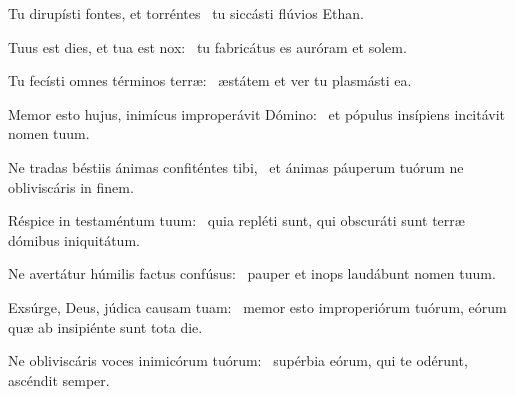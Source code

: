 \item Tu dirupísti fontes, et torréntes~\psstar{} tu siccásti flúvios Ethan.

\item Tuus est dies, et tua est nox:~\psstar{} tu fabricátus es auróram et solem.

\item Tu fecísti omnes términos terræ:~\psstar{} æstátem et ver tu plasmásti ea.

\item Memor esto hujus, inimícus improperávit Dómino:~\psstar{} et pópulus insípiens incitávit nomen tuum.

\item Ne tradas béstiis ánimas confiténtes tibi,~\psstar{} et ánimas páuperum tuórum ne obliviscáris in finem.

\item Réspice in testaméntum tuum:~\psstar{} quia repléti sunt, qui obscuráti sunt terræ dómibus iniquitátum.

\item Ne avertátur húmilis factus confúsus:~\psstar{} pauper et inops laudábunt nomen tuum.

\item Exsúrge, Deus, júdica causam tuam:~\psstar{} memor esto improperiórum tuórum, eórum quæ ab insipiénte sunt tota die.

\item Ne obliviscáris voces inimicórum tuórum:~\psstar{} supérbia eórum, qui te odérunt, ascéndit semper.

